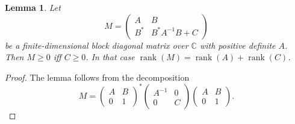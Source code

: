 \documentclass[
  american,aps,pra,reprint,floatfix,nofootinbib,superscriptaddress
]{revtex4-2}
\DeclareMathOperator{\rank}{rank}
\newtheorem{lemma}[theorem]{Lemma}
\begin{document}
\begin{lemma}
  \label{lm:block-diagonal}
  Let
  \begin{equation}
    M = \begin{pmatrix}A & B \\ B^* & B^* A^{-1} B + C\end{pmatrix}
  \end{equation}
  be a finite-dimensional block diagonal matrix over $\mathbb{C}$ with
  positive definite $A$.
  Then $M \geq 0$ iff $C \geq 0$.
  In that case $\rank(M) = \rank(A) + \rank(C)$.
\end{lemma}
\begin{proof}
  The lemma follows from the decomposition
  \begin{equation}
    M =
      \begin{pmatrix}A & B \\ 0 & 1\end{pmatrix}^*
      \begin{pmatrix}A^{-1} & 0 \\ 0 & C\end{pmatrix}
      \begin{pmatrix}A & B \\ 0 & 1\end{pmatrix}.
  \end{equation}
\end{proof}
\end{document}
